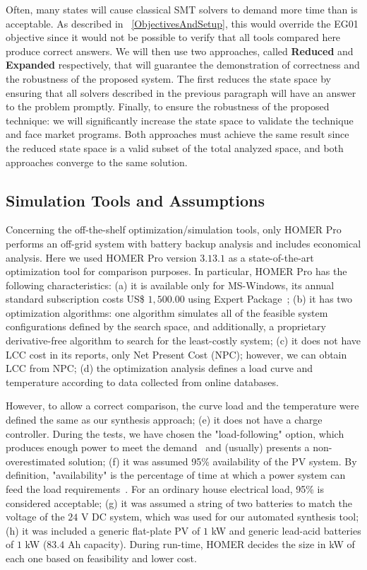 \documentclass[10pt,journal,compsoc]{IEEEtran}
\begin{document}
Often, many states will cause classical SMT solvers to demand more time than is acceptable. As described in ~\ref{ObjectivesAndSetup}, this would override the EG01 objective since it would not be possible to verify that all tools compared here produce correct answers. We will then use two approaches, called \textbf{Reduced} and \textbf{Expanded} respectively, that will guarantee the demonstration of correctness and the robustness of the proposed system. The first reduces the state space by ensuring that all solvers described in the previous paragraph will have an answer to the problem promptly. Finally, to ensure the robustness of the proposed technique: we will significantly increase the state space to validate the technique and face market programs. Both approaches must achieve the same result since the reduced state space is a valid subset of the total analyzed space, and both approaches converge to the same solution.\color{black}


\subsection{Simulation Tools and Assumptions}
\label{sec:SimulationToolsandAssumptions}
Concerning the off-the-shelf optimization/simulation tools, only HOMER Pro performs an off-grid system with battery backup analysis and includes economical analysis. Here we used HOMER Pro version $3.13.1$ as a state-of-the-art optimization tool for comparison purposes. In particular, HOMER Pro has the following characteristics:
  (a) it is available only for MS-Windows, its annual standard subscription costs US\$ $1,500.00$ using Expert Package~\cite{HOMER}; \color{black}
(b) it has two optimization algorithms: one algorithm simulates all of the feasible system configurations defined by the search space, and additionally, a proprietary derivative-free algorithm to search for the least-costly system;
(c) it does not have LCC cost in its reports, only Net Present Cost (NPC); however, we can obtain LCC from NPC; 
(d) the optimization analysis defines a load curve and temperature according to data collected from online databases. 

However, to allow a correct comparison, the curve load and the temperature were defined the same as our synthesis approach; 
(e) it does not have a charge controller. During the tests, we have chosen the "load-following" option, which produces enough power to meet the demand~\cite{HOMER} and (usually) presents a non-overestimated solution; 
(f) it was assumed 95\% availability of the PV system. By definition, "availability" is the percentage of time at which a power system can feed the load requirements~\cite{Khatib2014}. For an ordinary house electrical load, 95\% is considered acceptable;
(g) it was assumed a string of two batteries to match the voltage of the $24$ V DC system, which was used for our automated synthesis tool; 
(h) it was included a generic flat-plate PV of $1$ kW and generic lead-acid batteries of $1$ kW ($83.4$ Ah capacity). During run-time, HOMER decides the size in kW of each one based on feasibility and lower cost.
\end{document}

